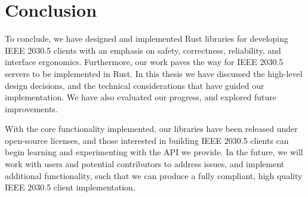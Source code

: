 \chapter{Conclusion}\label{ch:conclusion}
To conclude, we have designed and implemented Rust libraries for developing IEEE 2030.5 clients with an emphasis on safety, correctness, reliability, and interface ergonomics. Furthermore, our work paves the way for IEEE 2030.5 servers to be implemented in Rust. In this thesis we have discussed the high-level design decisions, and the technical considerations that have guided our implementation. We have also evaluated our progress, and explored future improvements.

With the core functionality implemented, our libraries have been released under open-source licenses, and those interested in building IEEE 2030.5 clients can begin learning and experimenting with the API we provide.
In the future, we will work with users and potential contributors to address issues, and implement additional functionality, such that we can produce a fully compliant, high quality IEEE 2030.5 client implementation.